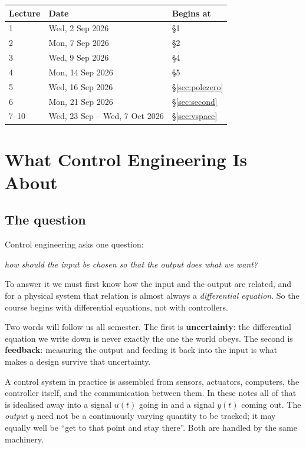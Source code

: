 \documentclass[11pt]{article}
\begin{document}
\smallskip
\begin{center}\small
\begin{tabular}{@{}lll@{}}
\toprule
Lecture & Date & Begins at\\
\midrule
1 & Wed, 2 Sep 2026  & \S1\\
2 & Mon, 7 Sep 2026  & \S2\\
3 & Wed, 9 Sep 2026  & \S4\\
4 & Mon, 14 Sep 2026 & \S5\\
5 & Wed, 16 Sep 2026 & \S\ref{sec:polezero}\\
6 & Mon, 21 Sep 2026 & \S\ref{sec:second}\\
7--10 & Wed, 23 Sep -- Wed, 7 Oct 2026 & \S\ref{sec:vspace}\\
\bottomrule
\end{tabular}
\end{center}

{\small\tableofcontents}



\section{What Control Engineering Is About}

\subsection{The question} Control engineering asks one question:
\begin{center}
\emph{how should the input be chosen so that the output does what we want?}
\end{center}
To answer it we must first know how the input and the output are related, and for
a physical system that relation is almost always a \emph{differential equation}.
So the course begins with differential equations, not with controllers.

Two words will follow us all semester. The first is \textbf{uncertainty}: the
differential equation we write down is never exactly the one the world obeys. The
second is \textbf{feedback}: measuring the output and feeding it back into the
input is what makes a design survive that uncertainty.

A control system in practice is assembled from sensors, actuators, computers, the
controller itself, and the communication between them. In these notes all of that
is idealised away into a signal $u(t)$ going in and a signal $y(t)$ coming out.
The \emph{output} $y$ need not be a continuously varying quantity to be tracked;
it may equally well be ``get to that point and stay there''. Both are handled by
the same machinery.
\end{document}
